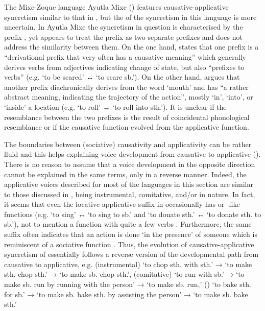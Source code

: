 The Mixe-Zoque language Ayutla Mixe () features causative-applicative syncretism similar to that in , but the  of the syncretism in this language is more uncertain. In Ayutla Mixe the syncretism in question is characterised by the prefix , yet \citet{romero-mendez:2009} appears to treat the prefix as two separate prefixes and does not address the similarity between them. On the one hand, \citet[97, 401f.]{romero-mendez:2009} states that one prefix  is a “derivational prefix that very often has a causative meaning” which generally derives verbs from adjectives indicating change of state, but also “prefixes to verbs” (e.g.  ‘to be scared’ ↔  ‘to scare sb.’). On the other hand, \citet[381ff., 602]{romero-mendez:2009} argues that another prefix  diachronically derives from the word  ‘mouth’ and has “a rather abstract meaning, indicating the trajectory of the action”, mostly ‘in’, ‘into’, or ‘inside’ a location (e.g.  ‘to roll’ ↔  ‘to roll into sth.’). It is unclear if the resemblance between the two prefixes  is the result of coincidental phonological resemblance or if the causative function evolved from the applicative function.

The boundaries between (sociative) causativity and applicativity can be rather fluid and this helps explaining voice development from causative to applicative (). There is no reason to assume that a voice development in the opposite direction cannot be explained in the same terms, only in a reverse manner. Indeed, the applicative voices described for most of the languages in this section are similar to those discussed in , being instrumental, comitative, and/or  in nature. In fact, it seems that even the locative applicative suffix  in  occasionally has  or -like functions (e.g.  ‘to sing’ ↔  ‘to sing to sb.’ and  ‘to donate sth.’ ↔  ‘to donate sth. to sb.’), not to mention a  function with quite a few verbs \citep[131ff.]{kanu:2012}. Furthermore, the same suffix often indicates that an action is done ‘in the presence’ of someone which is reminiscent of a sociative function \citep[130]{kanu:2012}. Thus, the evolution of causative-applicative syncretism of  essentially follows a reverse version of the developmental path from causative to applicative, e.g. (instrumental) ‘to chop sth. with sth.’ → ‘to make sth. chop sth.’ → ‘to make sb. chop sth.’, (comitative) ‘to run with sb.’ → ‘to make sb. run by running with the person’ → ‘to make sb. run,’ () ‘to bake sth. for sb.’ → ‘to make sb. bake sth. by assisting the person’ → ‘to make sb. bake sth.’

